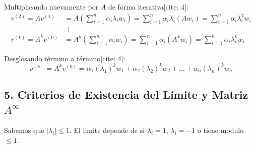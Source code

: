 \documentclass[11pt,a4paper]{article}
\theoremstyle{definition}
\begin{document}
Multiplicando nuevamente por $A$ de forma iterativa[cite: 4]:
\begin{align*}
    v^{(2)} = A v^{(1)} &= A \left( \sum_{i=1}^n \alpha_i \lambda_i w_i \right) = \sum_{i=1}^n \alpha_i \lambda_i (A w_i) = \sum_{i=1}^n \alpha_i \lambda_i^2 w_i \\
    &\;\;\vdots \\
    v^{(k)} = A^k v^{(0)} &= A^k \left( \sum_{i=1}^n \alpha_i w_i \right) = \sum_{i=1}^n \alpha_i (A^k w_i) = \sum_{i=1}^n \alpha_i \lambda_i^k w_i
\end{align*}

Desglosando término a término[cite: 4]:
\begin{equation}
    v^{(k)} = A^k v^{(0)} = \alpha_1 (\lambda_1)^k w_1 + \alpha_2 (\lambda_2)^k w_2 + \dots + \alpha_n (\lambda_n)^k w_n
\end{equation}

\subsection*{5. Criterios de Existencia del Límite y Matriz $A^\infty$}

Sabemos que $|\lambda_i| \leq 1 $. El limite depende de si $\lambda_i = 1$, $\lambda_i = -1$ o tiene modulo $\leq 1$. 
\end{document}
